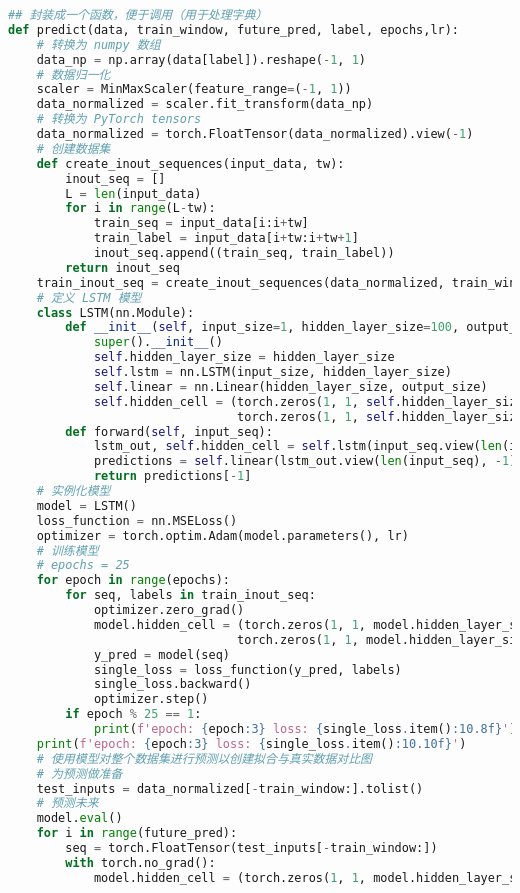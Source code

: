 \begin{lstlisting}[language=python,caption={就业前景}]
## 封装成一个函数，便于调用（用于处理字典）
def predict(data, train_window, future_pred, label, epochs,lr):
    # 转换为 numpy 数组
    data_np = np.array(data[label]).reshape(-1, 1)
    # 数据归一化
    scaler = MinMaxScaler(feature_range=(-1, 1))
    data_normalized = scaler.fit_transform(data_np)
    # 转换为 PyTorch tensors
    data_normalized = torch.FloatTensor(data_normalized).view(-1)
    # 创建数据集
    def create_inout_sequences(input_data, tw):
        inout_seq = []
        L = len(input_data)
        for i in range(L-tw):
            train_seq = input_data[i:i+tw]
            train_label = input_data[i+tw:i+tw+1]
            inout_seq.append((train_seq, train_label))
        return inout_seq
    train_inout_seq = create_inout_sequences(data_normalized, train_window)
    # 定义 LSTM 模型
    class LSTM(nn.Module):
        def __init__(self, input_size=1, hidden_layer_size=100, output_size=1):
            super().__init__()
            self.hidden_layer_size = hidden_layer_size
            self.lstm = nn.LSTM(input_size, hidden_layer_size)
            self.linear = nn.Linear(hidden_layer_size, output_size)
            self.hidden_cell = (torch.zeros(1, 1, self.hidden_layer_size),
                                torch.zeros(1, 1, self.hidden_layer_size))
        def forward(self, input_seq):
            lstm_out, self.hidden_cell = self.lstm(input_seq.view(len(input_seq), 1, -1), self.hidden_cell)
            predictions = self.linear(lstm_out.view(len(input_seq), -1))
            return predictions[-1]
    # 实例化模型
    model = LSTM()
    loss_function = nn.MSELoss()
    optimizer = torch.optim.Adam(model.parameters(), lr)
    # 训练模型
    # epochs = 25
    for epoch in range(epochs):
        for seq, labels in train_inout_seq:
            optimizer.zero_grad()
            model.hidden_cell = (torch.zeros(1, 1, model.hidden_layer_size),
                                torch.zeros(1, 1, model.hidden_layer_size))
            y_pred = model(seq)
            single_loss = loss_function(y_pred, labels)
            single_loss.backward()
            optimizer.step()
        if epoch % 25 == 1:
            print(f'epoch: {epoch:3} loss: {single_loss.item():10.8f}')
    print(f'epoch: {epoch:3} loss: {single_loss.item():10.10f}')
    # 使用模型对整个数据集进行预测以创建拟合与真实数据对比图
    # 为预测做准备
    test_inputs = data_normalized[-train_window:].tolist()
    # 预测未来
    model.eval()
    for i in range(future_pred):
        seq = torch.FloatTensor(test_inputs[-train_window:])
        with torch.no_grad():
            model.hidden_cell = (torch.zeros(1, 1, model.hidden_layer_size),

\end{lstlisting}
